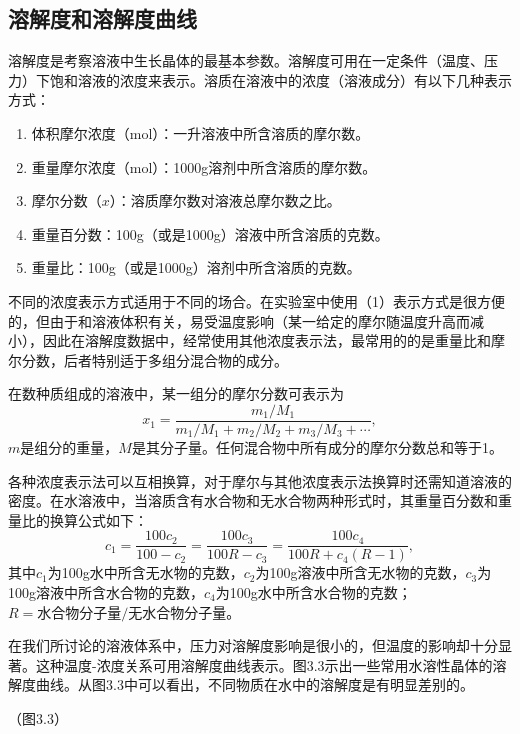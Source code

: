 ﻿\subsection{溶解度和溶解度曲线}
溶解度是考察溶液中生长晶体的最基本参数。溶解度可用在一定条件（温度、压力）下饱和溶液的浓度来表示。溶质在溶液中的浓度（溶液成分）有以下几种表示方式：
\begin{enumerate}[(1)]\itemsep -0.5ex
\item 体积摩尔浓度（mol）：一升溶液中所含溶质的摩尔数。
\item 重量摩尔浓度（mol）：1000g溶剂中所含溶质的摩尔数。
\item 摩尔分数（$x$）：溶质摩尔数对溶液总摩尔数之比。
\item 重量百分数：100g（或是1000g）溶液中所含溶质的克数。
\item 重量比：100g（或是1000g）溶剂中所含溶质的克数。
\end{enumerate}

不同的浓度表示方式适用于不同的场合。在实验室中使用（1）表示方式是很方便的，但由于和溶液体积有关，易受温度影响（某一给定的摩尔随温度升高而减小），因此在溶解度数据中，经常使用其他浓度表示法，最常用的的是重量比和摩尔分数，后者特别适于多组分混合物的成分。

在数种质组成的溶液中，某一组分的摩尔分数可表示为
\begin{equation}
x_1=\frac{m_1/M_1}{m_1/M_1+m_2/M_2+m_3/M_3+\cdots},
\end{equation}
$m$是组分的重量，$M$是其分子量。任何混合物中所有成分的摩尔分数总和等于1。

各种浓度表示法可以互相换算，对于摩尔与其他浓度表示法换算时还需知道溶液的密度。在水溶液中，当溶质含有水合物和无水合物两种形式时，其重量百分数和重量比的换算公式如下：
\begin{equation}
c_1=\frac{100c_2}{100-c_2}=\frac{100c_3}{100R-c_3}=\frac{100c_4}{100R+c_4(R-1)},
\end{equation}
其中$c_1$为100g水中所含无水物的克数，$c_2$为100g溶液中所含无水物的克数，$c_3$为100g溶液中所含水合物的克数，$c_4$为100g水中所含水合物的克数；$R=\text{水合物分子量}/\text{无水合物分子量}$。

在我们所讨论的溶液体系中，压力对溶解度影响是很小的，但温度的影响却十分显著。这种温度-浓度关系可用溶解度曲线表示。图3.3示出一些常用水溶性晶体的溶解度曲线。从图3.3中可以看出，不同物质在水中的溶解度是有明显差别的。

（图3.3）

